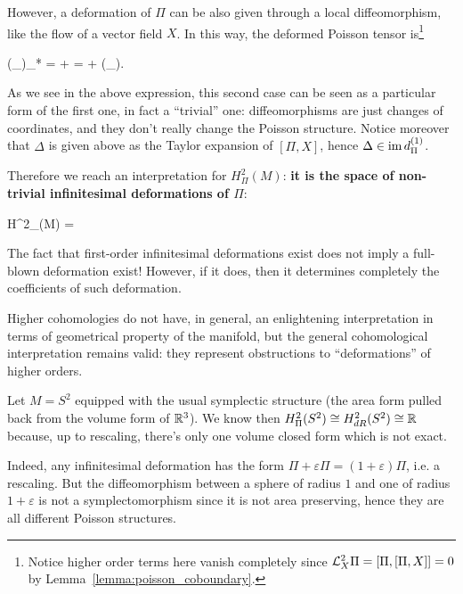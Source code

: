 However, a deformation of $\Pi$ can be also given through a local diffeomorphism, like the flow of a vector field $X$. In this way, the deformed Poisson tensor is\footnote{Notice higher order terms here vanish completely since $\mathcal{L}_{X}^2\Pi = [\Pi, [\Pi, X]] = 0$ by Lemma~\ref{lemma:poisson_coboundary}.}
\begin{eqalign}
	(\phi_\varepsilon)_* \Pi = \Pi + \varepsilon {}\Pi = \Pi + \varepsilon (_\Delta).
\end{eqalign}
As we see in the above expression, this second case can be seen as a particular form of the first one, in fact a ``trivial'' one: diffeomorphisms are just changes of coordinates, and they don't really change the Poisson structure. Notice moreover that $\Delta$ is given above as the Taylor expansion of $[\Pi, X]$, hence $\Delta \in \operatorname{im} d^{(1)}_\Pi$.

Therefore we reach an interpretation for $H_\Pi^2(M)$: \textbf{it is the space of non-trivial infinitesimal deformations of $\Pi$}:
\begin{eqalign}
	H^2_\Pi(M) = 
\end{eqalign}

\begin{remark}
	The fact that first-order infinitesimal deformations exist does not imply a full-blown deformation exist! However, if it does, then it determines completely the coefficients of such deformation.
\end{remark}

Higher cohomologies do not have, in general, an enlightening interpretation in terms of geometrical property of the manifold, but the general cohomological interpretation remains valid: they represent obstructions to ``deformations'' of higher orders.

\begin{example}
	Let $M=S^2$ equipped with the usual symplectic structure (the area form pulled back from the volume form of $\mathbb{R}^3$). We know then $H^2_\Pi(S^2) \overset{}{\cong} H^2_{dR}(S^2) \overset{}{\cong} \mathbb{R}$ because, up to rescaling, there's only one volume closed form which is not exact.

	Indeed, any infinitesimal deformation has the form $\Pi + \varepsilon \Pi = (1+\varepsilon)\Pi$, i.e. a rescaling. But the diffeomorphism between a sphere of radius $1$ and one of radius $1+\varepsilon$ is not a symplectomorphism since it is not area preserving, hence they are all different Poisson structures.
\end{example}


